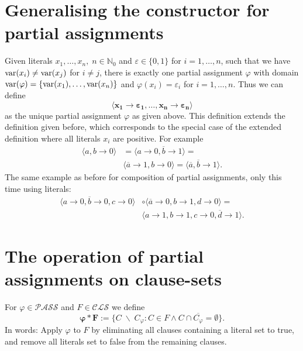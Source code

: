 \documentclass{article}
\def\mpass{{\mathcal{PASS}}}
\def\mcls{{\mathcal{CLS}}}
\def\var{{\rm var}}
\begin{document}
\section{Generalising the constructor for partial assignments}

Given literals $x_1, \ldots, x_n, \; n\in \mathbb{N}_0$ and $\varepsilon\in \{0,1\}$ for $i = 1, \ldots, n$, such that we have $\var(x_i)\neq \var(x_j)$ for $i\neq j$, there is exactly one partial assignment $\varphi$ with domain $\var(\varphi) = \{\var(x_1), \ldots, \var(x_n)\}$ and
$\varphi(x_i) = \varepsilon_i$ for $i = 1, \ldots, n$. Thus we can define
\[
\pmb{\langle x_1 \to \varepsilon_1, \ldots, x_n \to \varepsilon_n \rangle}
\]
as the unique partial assignment $\varphi$ as given above. This definition extends the definition given before, which corresponds to the special case of the extended definition where all literals $x_i$ are positive. For example
\begin{align*}
\langle a, b\to 0 \rangle & = \langle a\to 0, \overline{b}\to 1 \rangle = \\
& \langle \overline{a}\to 1, b\to 0 \rangle = \langle \overline{a}, \overline{b}\to 1 \rangle.
\end{align*}
The same example as before for composition of partial assignments, only this time using literals:
\begin{align*}
\langle a\to 0, \overline{b}\to 0, c\to 0 \rangle & \circ \langle \overline{a}\to 0, b\to 1, d\to 0 \rangle = \\
& \langle a\to 1, b\to 1, c\to 0, \overline{d}\to 1 \rangle.
\end{align*}

%


\section{The operation of partial assignments on clause-sets}

For $\varphi \in \mpass$ and $F\in \mcls$ we define
\[
\pmb{\varphi * F} := \{C \;\backslash\; C_\varphi : C\in F \wedge C\cap \overline{C_\varphi} = \emptyset\}.
\]
In words: Apply $\varphi$ to $F$ by eliminating all clauses containing a literal set to true, and remove all literals set to false from the remaining clauses.
\end{document}
